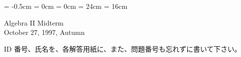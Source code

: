 

\topmargin = -0.5cm
\oddsidemargin = 0cm \evensidemargin = 0cm
\textheight = 24cm \textwidth = 16cm %

\pagestyle{empty}

\newtheorem{thm}{定理}
\newcommand{\bZ}{\mbox{\boldmath $Z$}}
\newcommand{\bQ}{\mbox{\boldmath $Q$}}
\newcommand{\bR}{\mbox{\boldmath $R$}}
\newcommand{\bC}{\mbox{\boldmath $C$}}
\newcommand{\bigx}{{\large $\times$}}


\begin{center}
{\gt\LARGE Algebra II  Midterm}\\
{\gt October 27, 1997, Autumn}
\end{center}

\noindent
ID 番号、氏名を、各解答用紙に、また、問題番号も忘れずに書いて下さい。

